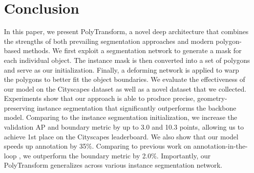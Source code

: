 \documentclass[10pt,twocolumn,letterpaper]{article}
\begin{document}
 \vspace{-2mm}
\section{Conclusion}
In this paper, we present PolyTransform, a novel deep architecture that combines the strengths of both prevailing segmentation approaches and modern polygon-based methods. We first exploit a segmentation network to generate a mask for each individual object. The instance mask is then converted into a set of polygons and serve as our initialization. Finally, a deforming network is applied to warp the polygons to better fit the object boundaries. We evaluate the effectiveness of our model on the Cityscapes dataset as well as a novel dataset that we collected.
Experiments show that our approach is able to produce precise, geometry-preserving instance segmentation that significantly outperforms the backbone model.
Comparing to the instance segmentation initialization, we increase the validation AP and boundary metric by up to 3.0 and 10.3 points, allowing us to achieve 1st place on the Cityscapes leaderboard. We also show that our model speeds up annotation by 35\%. Comparing to previous work on annotation-in-the-loop \cite{polygon-rnn++}, we outperform the boundary metric by 2.0\%. Importantly, our PolyTransform generalizes across various instance segmentation network.  


{\small


}
\end{document}

